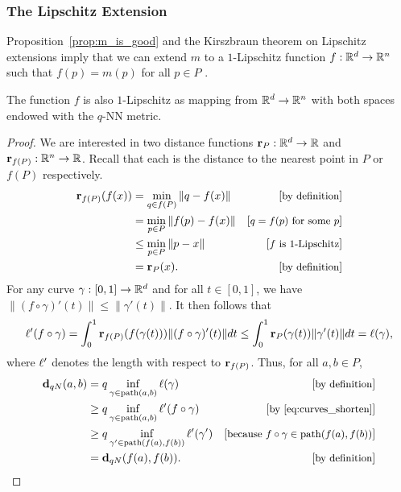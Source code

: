 \subsubsection{The Lipschitz Extension} %
\label{sec:lip_extension}

  Proposition~\ref{prop:m_is_good} and the Kirszbraun theorem on Lipschitz
extensions imply that we can extend $m$ to a $1$-Lipschitz function $f:
\mathbb{R}^d\to \mathbb{R}^n$ such that $f(p) = m(p)$ for all $p\in P$
\cite{Kirszbraun1934,Valentine1945,brehm1981}.

  \begin{lemma}\label{lem:dist_N_lipschitz}
    The function $f$ is also $1$-Lipschitz as mapping from $\mathbb{R}^d\to \mathbb{R}^n$
with both spaces endowed with the $q$-NN metric.
  \end{lemma}
  \begin{proof}
    We are interested in two distance functions $\mathbf{r}_P:\mathbb{R}^d \to \mathbb{R}$ and $\mathbf{r}_{f(P)}: \mathbb{R}^n\to \mathbb{R}$.
    Recall that each is the distance to the nearest point in $P$ or $f(P)$ respectively.
    \begin{align*}
      \mathbf{r}_{f(P)}(f(x)) 
        &= \min_{q\in f(P)} \|q - f(x)\| &\left[\text{\small{by definition}}\right]\\
        &= \min_{p\in P} \|f(p) - f(x)\| &\left[\text{\small{$q = f(p)$ for some $p$}}\right]\\
        &\le \min_{p\in P} \|p - x\| &\left[\text{\small{$f$ is $1$-Lipschitz}}\right]\\ 
        &= \mathbf{r}_P(x). &\left[\text{\small{by definition}}\right]
    \end{align*}
    For any curve $\gamma:[0,1]\to \mathbb{R}^d$ and for all $t\in [0,1]$, we have $\|(f\circ \gamma)'(t)\| \le \|\gamma'(t)\|$.
    It then follows that
    \begin{equation}\label{eq:curves_shorten}
      \ell'(f\circ \gamma) = \int_0^1 \mathbf{r}_{f(P)}(f(\gamma(t)))\|(f\circ\gamma)'(t)\|dt \le \int_0^1 \mathbf{r}_{P}(\gamma(t))\|\gamma'(t)\|dt = \ell(\gamma),
    \end{equation}
    where $\ell'$ denotes the length with respect to $\mathbf{r}_{f(P)}$.
    Thus, for all $a,b\in P$,
    \begin{align*}
      \mathbf{d}_{qN}(a,b)
        &= q \inf_{\gamma\in \mathrm{path}(a,b)} \ell(\gamma) &\left[\text{\small{by definition}}\right]\\
        &\ge q \inf_{\gamma\in \mathrm{path}(a,b)} \ell'(f\circ\gamma) &\left[\text{\small{by \eqref{eq:curves_shorten}}}\right]\\
        &\ge q \inf_{\gamma'\in \mathrm{path}(f(a),f(b))} \ell'(\gamma') &\left[\text{\small{because $f\circ\gamma\in \mathrm{path}(f(a), f(b))$}}\right]\\
        &= \mathbf{d}_{qN}(f(a), f(b)). &\left[\text{\small{by definition}}\right]
    \end{align*}
  \end{proof}

